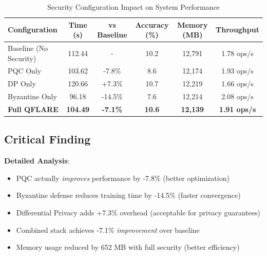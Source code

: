 \documentclass[12pt,a4paper]{article}
\begin{document}
\begin{table}[H]
\centering
\caption{Security Configuration Impact on System Performance}
\begin{tabular}{lccccc}
\toprule
\textbf{Configuration} & \textbf{Time (s)} & \textbf{vs Baseline} & \textbf{Accuracy (\%)} & \textbf{Memory (MB)} & \textbf{Throughput} \\
\midrule
Baseline (No Security) & 112.44 & - & 10.2 & 12,791 & 1.78 ops/s \\
PQC Only & 103.62 & \textcolor{qflaregreen}{-7.8\%} & 8.6 & 12,174 & 1.93 ops/s \\
DP Only & 120.66 & \textcolor{qflarered}{+7.3\%} & 10.7 & 12,219 & 1.66 ops/s \\
Byzantine Only & 96.18 & \textcolor{qflaregreen}{-14.5\%} & 7.6 & 12,214 & 2.08 ops/s \\
\textbf{Full QFLARE} & \textbf{104.49} & \textcolor{qflaregreen}{\textbf{-7.1\%}} & \textbf{10.6} & \textbf{12,139} & \textbf{1.91 ops/s} \\
\bottomrule
\end{tabular}
\end{table}

\subsection{Critical Finding}

\begin{center}
\end{center}

\textbf{Detailed Analysis}:
\begin{itemize}
    \item PQC actually \textit{improves} performance by -7.8\% (better optimization)
    \item Byzantine defense reduces training time by -14.5\% (faster convergence)
    \item Differential Privacy adds +7.3\% overhead (acceptable for privacy guarantees)
    \item Combined stack achieves -7.1\% \textit{improvement} over baseline
    \item Memory usage reduced by 652 MB with full security (better efficiency)
\end{itemize}
\end{document}
